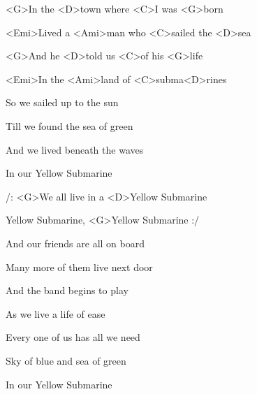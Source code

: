 

\zs
<G>In the <D>town where <C>I was <G>born

<Emi>Lived a <Ami>man who <C>sailed the <D>sea

<G>And he <D>told us <C>of his <G>life

<Emi>In the <Ami>land of <C>subma<D>rines
\ks

\zs
So we sailed up to the sun

Till we found the sea of green

And we lived beneath the waves

In our Yellow Submarine
\ks

\zr
/: <G>We all live in a <D>Yellow Submarine

Yellow Submarine, <G>Yellow Submarine :/
\kr

\zs
And our friends are all on board

Many more of them live next door

And the band begins to play
\ks

\zr \kr

\zs
As we live a life of ease

Every one of us has all we need

Sky of blue and sea of green

In our Yellow Submarine
\ks

\zr \kr \zr \kr

\kp





